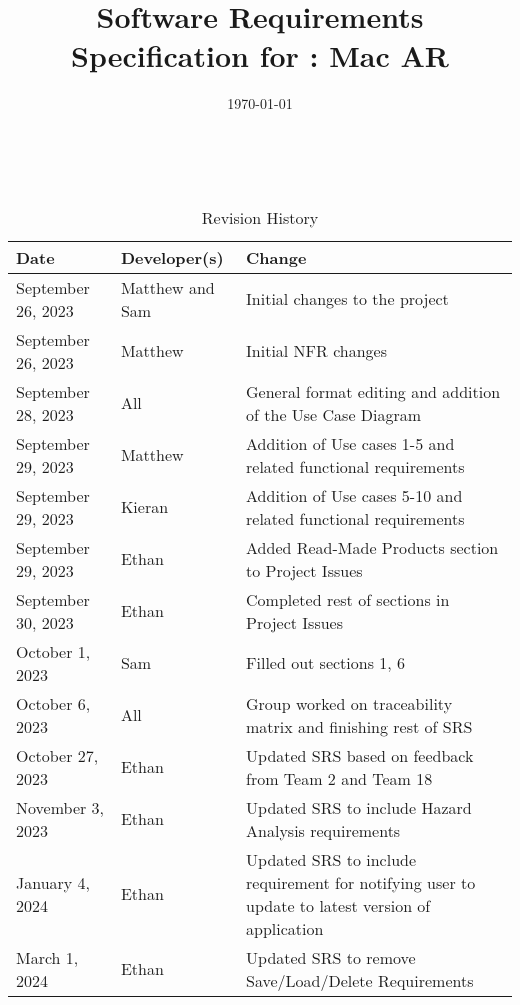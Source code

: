 \documentclass[12pt]{article}
\begin{document}
\title{Software Requirements Specification for \progname: Mac AR}
\author{\authname}
\date{\today}

\maketitle

~\newpage


\tableofcontents

\begin{table}[hp]
	\caption{Revision History} \label{TblRevisionHistory}
	\begin{tabularx}{\textwidth}{llX}
		\toprule
		\textbf{Date}      & \textbf{Developer(s)} & \textbf{Change}                                                                    \\
		\midrule
		September 26, 2023 & Matthew and Sam               & Initial changes to the project                                                             \\
            September 26, 2023 & Matthew & Initial NFR changes \\
            September 28, 2023 & All & General format editing and addition of the Use Case Diagram\\
            September 29, 2023 & Matthew & Addition of Use cases 1-5 and related functional requirements\\
            September 29, 2023 & Kieran & Addition of Use cases 5-10 and related functional requirements\\
            September 29, 2023 & Ethan & Added Read-Made Products section to Project Issues\\
            September 30, 2023 & Ethan & Completed rest of sections in Project Issues\\
            October 1, 2023 & Sam & Filled out sections 1, 6\\
            October 6, 2023 & All & Group worked on traceability matrix and finishing rest of SRS\\  
            October 27, 2023 & Ethan & Updated SRS based on feedback from Team 2 and Team 18\\
            November 3, 2023 & Ethan & Updated SRS to include Hazard Analysis requirements\\
            January 4, 2024 & Ethan & Updated SRS to include requirement for notifying user to update to latest version of application\\
            March 1, 2024 & Ethan & Updated SRS to remove Save/Load/Delete Requirements\\

\end{tabularx}
\end{table}
\end{document}
